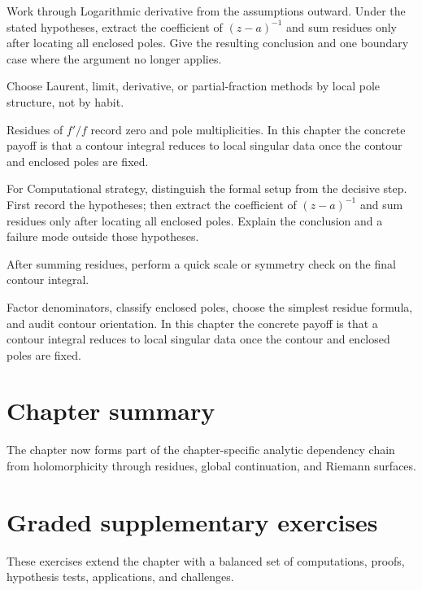 \begin{exercise}\label{exr:iv10-07}
Work through Logarithmic derivative from the assumptions outward. Under the stated hypotheses, extract the coefficient of \((z-a)^{-1}\) and sum residues only after locating all enclosed poles. Give the resulting conclusion and one boundary case where the argument no longer applies.
\end{exercise}
\begin{hint}
Choose Laurent, limit, derivative, or partial-fraction methods by local pole structure, not by habit.
\end{hint}
\begin{solution}
Residues of $f'/f$ record zero and pole multiplicities. In this chapter the concrete payoff is that a contour integral reduces to local singular data once the contour and enclosed poles are fixed.
\end{solution}

\begin{exercise}\label{exr:iv10-08}
For Computational strategy, distinguish the formal setup from the decisive step. First record the hypotheses; then extract the coefficient of \((z-a)^{-1}\) and sum residues only after locating all enclosed poles. Explain the conclusion and a failure mode outside those hypotheses.
\end{exercise}
\begin{hint}
After summing residues, perform a quick scale or symmetry check on the final contour integral.
\end{hint}
\begin{solution}
Factor denominators, classify enclosed poles, choose the simplest residue formula, and audit contour orientation. In this chapter the concrete payoff is that a contour integral reduces to local singular data once the contour and enclosed poles are fixed.
\end{solution}

\section*{Chapter summary}
The chapter now forms part of the chapter-specific analytic dependency chain from holomorphicity through residues, global continuation, and Riemann surfaces.
\section{Graded supplementary exercises}
These exercises extend the chapter with a balanced set of computations, proofs, hypothesis tests, applications, and challenges.

